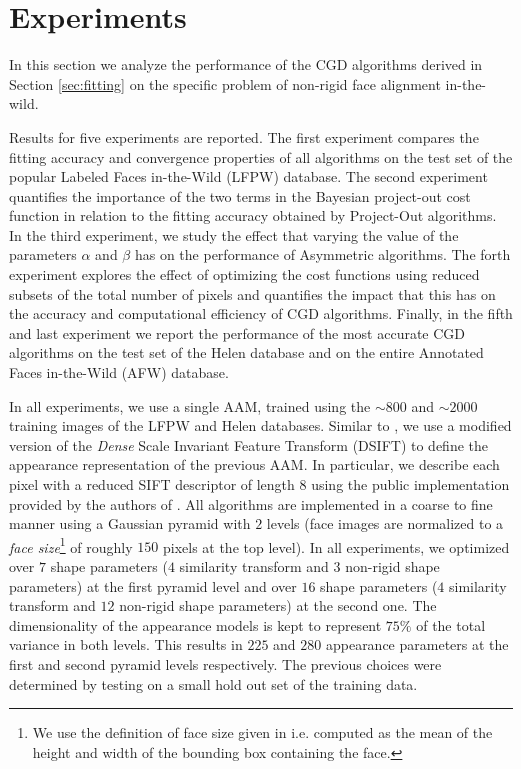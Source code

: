 \section{Experiments}
\label{sec:experiment}

In this section we analyze the performance of the CGD algorithms derived in Section \ref{sec:fitting} on the specific problem of non-rigid face alignment in-the-wild. 

Results for five experiments are reported. The first experiment compares the fitting accuracy and convergence properties of all algorithms on the test set of the popular Labeled Faces in-the-Wild (LFPW) \cite{Belhumeur2011} database. The second experiment quantifies the importance of the two terms in the Bayesian project-out cost function in relation to the fitting accuracy obtained by Project-Out algorithms. In the third experiment, we study the effect that varying the value of the parameters $\alpha$ and $\beta$ has on the performance of Asymmetric algorithms. The forth experiment explores the effect of optimizing the cost functions using reduced subsets of the total number of pixels and quantifies the impact that this has on the accuracy and computational efficiency of CGD algorithms. Finally, in the fifth and last experiment we report the performance of the most accurate CGD algorithms on the test set of the Helen \cite{Le2012} database and on the entire Annotated Faces in-the-Wild (AFW) \cite{Zhu2012} database.

In all experiments, we use a single AAM, trained using the $\sim800$ and $\sim2000$ training images of the LFPW and Helen databases. Similar to \cite{Tzimiropoulos2014}, we use a modified version of the \emph{Dense} Scale Invariant Feature Transform (DSIFT) \cite{Lowe1999, Dalal2005} to define the appearance representation of the previous AAM. In particular, we describe each pixel with a reduced SIFT descriptor of length $8$ using the public implementation provided by the authors of \cite{Vedaldi2008vlfeat}. All algorithms are implemented in a coarse to fine manner using a Gaussian pyramid with $2$ levels (face images are normalized to a \emph{face size}\footnote{We use the definition of face size given in \cite{Zhu2012} i.e. computed as the mean of the height and width of the bounding box containing the face.} of roughly $150$ pixels at the top level). In all experiments, we optimized over $7$ shape parameters ($4$ similarity transform and $3$ non-rigid shape parameters) at the first pyramid level and over $16$ shape parameters ($4$ similarity transform and $12$ non-rigid shape parameters) at the second one. The dimensionality of the appearance models is kept to represent $75\%$ of the total variance in both levels. This results in $225$ and $280$ appearance parameters at the first and second pyramid levels respectively. The previous choices were determined by testing on a small hold out set of the training data. 


